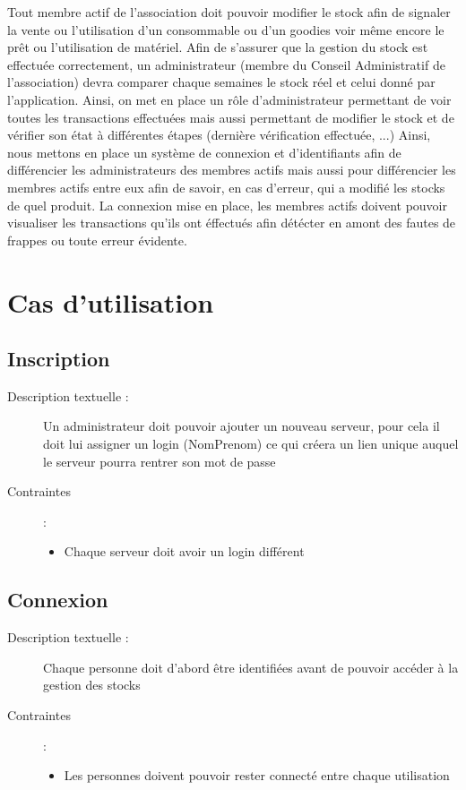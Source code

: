 \documentclass{article}
\begin{document}
  Tout membre actif de l’association doit pouvoir modifier le stock afin de signaler la vente ou l’utilisation d’un consommable ou d’un goodies voir même encore le prêt ou l’utilisation de matériel. \newline
  Afin de s’assurer que la gestion du stock est effectuée correctement, un administrateur (membre du Conseil Administratif de l'association) devra comparer chaque semaines le stock réel et celui donné par l’application. \newline
  Ainsi, on met en place un rôle d’administrateur permettant de voir toutes les transactions effectuées mais aussi permettant de modifier le stock et de vérifier son état à différentes étapes (dernière vérification effectuée, ...) \newline
  Ainsi, nous mettons en place un système de connexion et d’identifiants afin de différencier les administrateurs des membres actifs mais aussi pour différencier les membres actifs entre eux afin de savoir, en cas d'erreur, qui a modifié les stocks de quel produit. \newline
  La connexion mise en place, les membres actifs doivent pouvoir visualiser les transactions qu'ils ont éffectués afin détécter en amont des fautes de frappes ou toute erreur évidente.

\section{Cas d'utilisation }
  \subsection{Inscription}
    \begin{description}
      \item[Description textuelle :] Un administrateur doit pouvoir ajouter un nouveau serveur, pour cela il doit lui assigner un login (NomPrenom) ce qui créera un lien unique auquel le serveur pourra rentrer son mot de passe
      \item[Contraintes ]:  
        \begin{itemize}
          \item Chaque serveur doit avoir un login différent
        \end{itemize}
    \end{description}
  \subsection{Connexion}
    \begin{description}
      \item[Description textuelle :] Chaque personne doit d'abord être identifiées avant de pouvoir accéder à la gestion des stocks
      \item[Contraintes ]:  
        \begin{itemize}
          \item Les personnes doivent pouvoir rester connecté entre chaque utilisation
        \end{itemize}
    \end{description}
\end{document}
